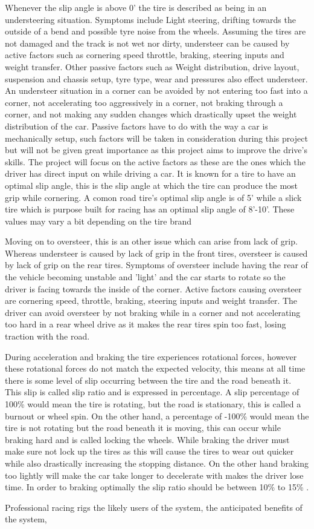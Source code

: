 Whenever the slip angle is above 0’ the tire is described as being in an understeering situation. Symptoms include Light steering, drifting towards the outside of a bend and possible tyre noise from the wheels. Assuming the tires are not damaged and the track is not wet nor dirty, understeer can be caused by active factors such as cornering speed throttle, braking, steering inputs and weight transfer. Other passive factors such as Weight distribution, drive layout, suspension and chassis setup, tyre type, wear and pressures also effect understeer. An understeer situation in a corner can be avoided by not entering too fast into a corner, not accelerating too aggressively in a corner, not braking through a corner, and not making any sudden changes which drastically upset the weight distribution of the car. Passive factors have to do with the way a car is mechanically setup, such factors will be taken in consideration during this project but will not be given great importance as this project aims to improve the drive’s skills. The project will focus on the active factors as these are the ones which the driver has direct input on while driving a car. It is known for a tire to have an optimal slip angle, this is the slip angle at which the tire can produce the most grip while cornering. A comon road tire’s optimal slip angle is of 5’ while a slick tire which is purpose built for racing has an optimal slip angle of 8’-10’. These values may vary a bit depending on the tire brand\cite{beckman1991physics}

Moving on to oversteer, this is an other issue which can arise from lack of grip. Whereas understeer is caused by lack of grip in the front tires, oversteer is caused by lack of grip on the rear tires. Symptoms of oversteer include having the rear of the vehicle becoming unstable and 'light' and the car starts to rotate so the driver is facing towards the inside of the corner. Active factors causing oversteer are cornering speed, throttle, braking, steering inputs and weight transfer. The driver can avoid oversteer by not braking while in a corner and not accelerating too hard in a rear wheel drive as it makes the rear tires spin too fast, losing traction with the road.

During acceleration and braking the tire experiences rotational forces, however these rotational forces do not match the expected velocity, this means at all time there is some level of slip occurring between the tire and the road beneath it. This slip is called slip ratio and is expressed in percentage. A slip percentage of 100\% would mean the tire is rotating, but the road is stationary, this is called a burnout or wheel spin. On the other hand, a percentage of -100\% would mean the tire is not rotating but the road beneath it is moving, this can occur while braking hard and is called locking the wheels\cite{pacejka2006tire}. While braking the driver must make sure not lock up the tires as this will cause the tires to wear out quicker while also drastically increasing the stopping distance. On the other hand braking too lightly will make the car take longer to decelerate with makes the driver lose time. In order to braking optimally the slip ratio should be between 10\% to 15\% \cite{GoingFaster}.

Professional racing rigs
the likely users of the system,
the anticipated benefits of the system,





